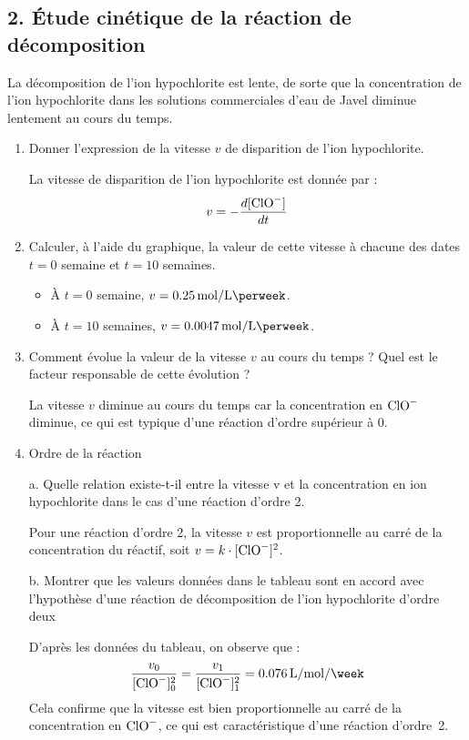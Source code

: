 \documentclass[12pt,a4paper]{article}
\newcommand{\correction}[1]{\textcolor{correction}{#1}}
\begin{document}
\subsection*{2. Étude cinétique de la réaction de décomposition}
La décomposition de l’ion hypochlorite est lente, de sorte que la concentration de l’ion hypochlorite dans les solutions commerciales d’eau de Javel diminue lentement au cours du temps.

\begin{enumerate}
    \item Donner l’expression de la vitesse $v$ de disparition de l’ion hypochlorite.

    \correction{
        La vitesse de disparition de l'ion hypochlorite est donnée par :
        $$
        v = -\frac{d[\ce{ClO-}]}{dt}
        $$
    }

    \item Calculer, à l’aide du graphique, la valeur de cette vitesse à chacune des dates $t = 0$ semaine et $t = 10$ semaines.

    \correction{
        \begin{itemize}
            \item À $t = 0$ semaine, $v = \SI{0,25}{\mole\per\liter\perweek}$.
            \item À $t = 10$ semaines, $v = \SI{0,0047}{\mole\per\liter\perweek}$.
        \end{itemize}
    }

    \item Comment évolue la valeur de la vitesse $v$ au cours du temps ? Quel est le facteur responsable de cette évolution ?

    \correction{
        La vitesse $v$ diminue au cours du temps car la concentration en $\ce{ClO-}$ diminue, ce qui est typique d'une réaction d'ordre supérieur à 0.
    }

    \item Ordre de la réaction
    
    a. Quelle relation existe-t-il entre la vitesse v et la concentration en ion hypochlorite dans le cas d’une réaction d’ordre 2.

    \correction{
    Pour une réaction d'ordre 2, la vitesse $v$ est proportionnelle au carré de la concentration du réactif, soit $v = k \cdot [\ce{ClO-}]^2$.
    }

    b. Montrer que les valeurs données dans le tableau sont en accord avec l’hypothèse d’une réaction de décomposition de l’ion hypochlorite d’ordre deux

    \correction{
        D'après les données du tableau, on observe que :
        $$
        \frac{v_0}{[\ce{ClO-}]_0^2} = \frac{v_1}{[\ce{ClO-}]_1^2} = \SI{0,076}{\liter\per\mole\per\week}
        $$
        Cela confirme que la vitesse est bien proportionnelle au carré de la concentration en $\ce{ClO-}$, ce qui est caractéristique d'une réaction d'ordre~2.
    }

\end{enumerate}
    
\end{document}
